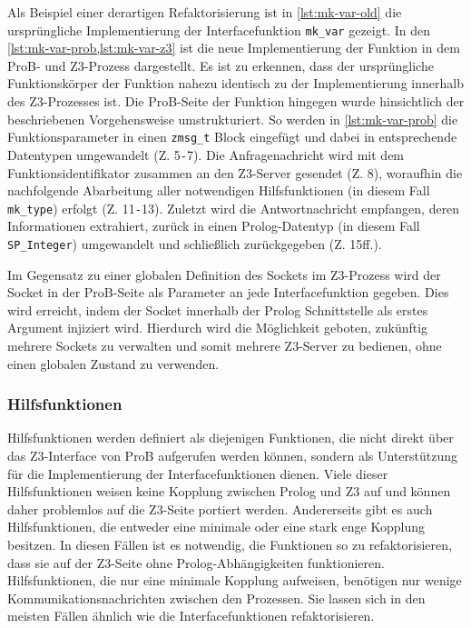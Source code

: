 Als Beispiel einer derartigen Refaktorisierung ist in \cref{lst:mk-var-old} die ursprüngliche Implementierung der Interfacefunktion \texttt{mk\_var} gezeigt.
In den \cref{lst:mk-var-prob,lst:mk-var-z3} ist die neue Implementierung der Funktion in dem ProB- und Z3-Prozess dargestellt.
Es ist zu erkennen, dass der ursprüngliche Funktionskörper der Funktion nahezu identisch zu der Implementierung innerhalb des Z3-Prozesses ist.
Die ProB-Seite der Funktion hingegen wurde hinsichtlich der beschriebenen Vorgehensweise umstrukturiert.
So werden in \cref{lst:mk-var-prob} die Funktionsparameter in einen \texttt{zmsg\_t} Block eingefügt und dabei in entsprechende Datentypen umgewandelt (Z. 5\texttt{-}7).
Die Anfragenachricht wird mit dem Funktionsidentifikator zusammen an den Z3-Server gesendet (Z. 8), woraufhin
die nachfolgende Abarbeitung aller notwendigen Hilfsfunktionen (in diesem Fall \texttt{mk\_type}) erfolgt (Z. 11\texttt{-}13).
Zuletzt wird die Antwortnachricht empfangen, deren Informationen extrahiert, zurück in einen Prolog-Datentyp (in diesem Fall \texttt{SP\_Integer}) umgewandelt und schließlich zurückgegeben (Z. 15ff.).

Im Gegensatz zu einer globalen Definition des Sockets im Z3-Prozess wird der Socket in der ProB-Seite als Parameter an jede Interfacefunktion gegeben.
Dies wird erreicht, indem der Socket innerhalb der Prolog Schnittstelle als erstes Argument injiziert wird.
Hierdurch wird die Möglichkeit geboten, zukünftig mehrere Sockets zu verwalten und somit mehrere Z3-Server zu bedienen, ohne einen globalen Zustand zu verwenden.

\subsubsection{Hilfsfunktionen}
\label{subsec:helper-functions}
Hilfsfunktionen werden definiert als diejenigen Funktionen, die nicht direkt über das Z3-Interface von ProB aufgerufen werden können,
sondern als Unterstützung für die Implementierung der Interfacefunktionen dienen.
Viele dieser Hilfsfunktionen weisen keine Kopplung zwischen Prolog und Z3 auf und können daher problemlos auf die Z3-Seite portiert werden.
Andererseits gibt es auch Hilfsfunktionen, die entweder eine minimale oder eine stark enge Kopplung besitzen.
In diesen Fällen ist es notwendig, die Funktionen so zu refaktorisieren, dass sie auf der Z3-Seite ohne Prolog-Abhängigkeiten funktionieren.
Hilfsfunktionen, die nur eine minimale Kopplung aufweisen, benötigen nur wenige Kommunikationsnachrichten zwischen den Prozessen.
Sie lassen sich in den meisten Fällen ähnlich wie die Interfacefunktionen refaktorisieren.

